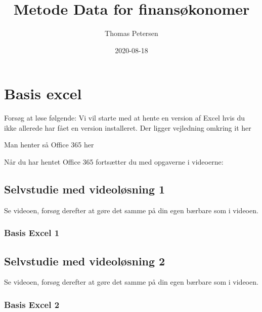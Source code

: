 \documentclass[
]{book}
\title{Metode Data for finansøkonomer}
\author{Thomas Petersen}
\date{2020-08-18}
\begin{document}
\maketitle

{
\setcounter{tocdepth}{1}
\tableofcontents
}
\hypertarget{section}{%
\chapter*{}\label{section}}

\hypertarget{basis-excel}{%
\chapter{Basis excel}\label{basis-excel}}

Forsøg at løse følgende:
Vi vil starte med at hente en version af Excel hvis du ikke allerede har fået en version installeret. Der ligger vejledning omkring it her

Man henter så Office 365 her

Når du har hentet Office 365 fortsætter du med opgaverne i videoerne:

\hypertarget{selvstudie-med-videoluxf8sning-1}{%
\section{Selvstudie med videoløsning 1}\label{selvstudie-med-videoluxf8sning-1}}

Se videoen, forsøg derefter at gøre det samme på din egen bærbare som i videoen.

\hypertarget{basis-excel-1}{%
\subsection{Basis Excel 1}\label{basis-excel-1}}

\begin{embed-container}

\end{embed-container}

\hypertarget{selvstudie-med-videoluxf8sning-2}{%
\section{Selvstudie med videoløsning 2}\label{selvstudie-med-videoluxf8sning-2}}

Se videoen, forsøg derefter at gøre det samme på din egen bærbare som i videoen.

\hypertarget{basis-excel-2}{%
\subsection{Basis Excel 2}\label{basis-excel-2}}
\end{document}
